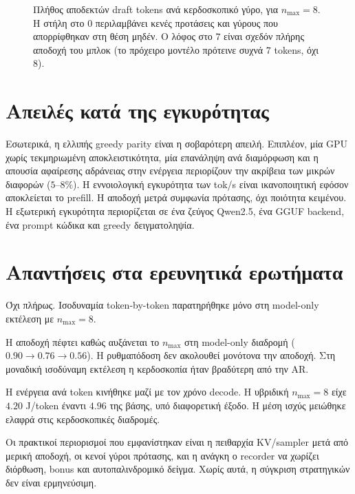 \documentclass[a4paper,12pt]{report}
\theoremstyle{plain}
\theoremstyle{definition}
\theoremstyle{remark}
\begin{document}
\begin{figure}[htbp]
  \centering
  \resizebox{\linewidth}{!}{}
  \caption{Πλήθος αποδεκτών draft tokens ανά κερδοσκοπικό γύρο, για
    \(n_{\max}=8\). Η στήλη στο \(0\) περιλαμβάνει κενές προτάσεις και γύρους
    που απορρίφθηκαν στη θέση μηδέν. Ο λόφος στο \(7\) είναι σχεδόν πλήρης
    αποδοχή του μπλοκ (το πρόχειρο μοντέλο πρότεινε συχνά \(7\) tokens, όχι
  \(8\)).}
  \label{fig:rounds-n8}
\end{figure}

\FloatBarrier

\section{Απειλές κατά της εγκυρότητας}

Εσωτερικά, η ελλιπής greedy parity είναι η σοβαρότερη απειλή. Επιπλέον, μία
GPU χωρίς τεκμηριωμένη αποκλειστικότητα, μία επανάληψη ανά διαμόρφωση και η
απουσία αφαίρεσης αδράνειας στην ενέργεια περιορίζουν την ακρίβεια των μικρών
διαφορών (\(5\)--\(8\%\)). Η εννοιολογική εγκυρότητα των tok/s είναι
ικανοποιητική εφόσον
αποκλείεται το prefill. Η αποδοχή μετρά συμφωνία πρότασης, όχι ποιότητα
κειμένου. Η εξωτερική εγκυρότητα περιορίζεται σε ένα ζεύγος Qwen2.5, ένα
GGUF backend, ένα prompt κώδικα και greedy δειγματοληψία.

\section{Απαντήσεις στα ερευνητικά ερωτήματα}

\begin{description}[style=nextline,leftmargin=1.6em,font=\bfseries]
  \item[RQ1.]
    Όχι πλήρως. Ισοδυναμία token-by-token παρατηρήθηκε μόνο στη model-only
    εκτέλεση με \(n_{\max}=8\).
  \item[RQ2.]
    Η αποδοχή πέφτει καθώς αυξάνεται το \(n_{\max}\) στη model-only διαδρομή
    (\(0.90\rightarrow 0.76\rightarrow 0.56\)). Η ρυθμαπόδοση δεν ακολουθεί
    μονότονα την αποδοχή. Στη μοναδική ισοδύναμη εκτέλεση η κερδοσκοπία ήταν
    βραδύτερη από την AR.
  \item[RQ3.]
    Η ενέργεια ανά token κινήθηκε μαζί με τον χρόνο decode. Η υβριδική
    \(n_{\max}=8\) είχε \(4.20\) J/token έναντι \(4.96\) της βάσης, υπό
    διαφορετική έξοδο. Η μέση ισχύς μειώθηκε ελαφρά στις κερδοσκοπικές
    διαδρομές.
  \item[RQ4.]
    Οι πρακτικοί περιορισμοί που εμφανίστηκαν είναι η πειθαρχία KV/sampler μετά
    από μερική αποδοχή, οι κενοί γύροι πρότασης, και η ανάγκη ο recorder να
    χωρίζει διόρθωση, bonus και αυτοπαλινδρομικό δείγμα. Χωρίς αυτά, η σύγκριση
    στρατηγικών δεν είναι ερμηνεύσιμη.
\end{description}
\end{document}
